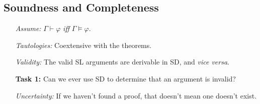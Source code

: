 \documentclass[a4paper, 11pt]{article} %
\begin{document}
\begin{multicols}{2}
%
%


\section*{Soundness and Completeness}

\begin{enumerate}
  \item[\it Assume:] $\Gamma \vdash \varphi$ \textit{iff} $\Gamma \vDash \varphi$.
  \item[\it Tautologies:] Coextensive with the theorems.
  \item[\it Validity:] The valid SL arguments are derivable in SD, and \textit{vice versa}.
  \item[\bf Task 1:] Can we ever use SD to determine that an argument is invalid?
  \item[\it Uncertainty:] If we haven't found a proof, that doesn't mean one doesn't exist. 
\end{enumerate}




\end{multicols}
\end{document}
